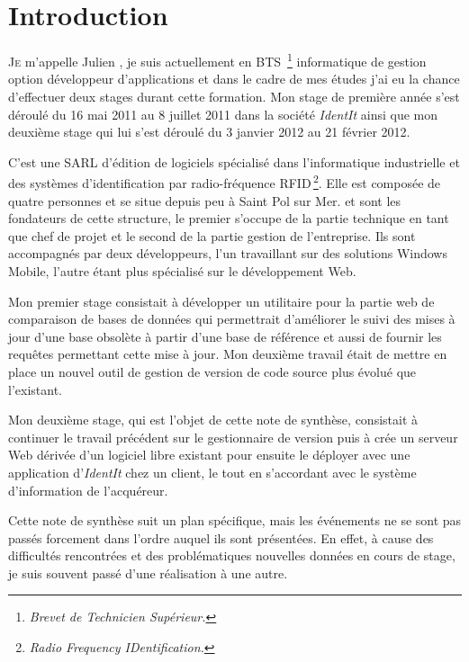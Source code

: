 \chapter{Introduction} %
\label{cha:Introduction}

\lettrine{J}{e} m'appelle Julien , je suis actuellement en
BTS\, \footnote{\emph{Brevet de Technicien Supérieur.}} informatique de
gestion option développeur d'applications et dans le cadre de mes études
j'ai eu la chance d'effectuer deux stages durant cette formation. Mon
stage de première année s'est déroulé du 16 mai 2011 au 8 juillet 2011
dans la société \emph{IdentIt} ainsi que mon deuxième stage qui lui
s'est déroulé du 3 janvier 2012 au 21 février 2012.

C'est une SARL d'édition de logiciels spécialisé dans l'informatique
industrielle et des systèmes d'identification par radio-fréquence
RFID\,\footnote{\emph{Radio Frequency IDentification.}}. Elle est
composée de quatre personnes et se situe depuis peu à Saint Pol sur Mer.
 et  sont les fondateurs de cette
structure, le premier s'occupe de la partie technique en tant que chef
de projet et le second de la partie gestion de l'entreprise. Ils sont
accompagnés par deux développeurs, l'un travaillant sur des solutions
Windows Mobile, l'autre étant plus spécialisé sur le
développement Web.

Mon premier stage consistait à développer un utilitaire pour la partie
web de comparaison de bases de données qui permettrait d'améliorer le
suivi des mises à jour d'une base obsolète à partir d'une base de
référence et aussi de fournir les requêtes permettant cette mise à jour.
Mon deuxième travail était de mettre en place un nouvel outil de gestion
de version de code source plus évolué que l'existant.

Mon deuxième stage, qui est l'objet de cette note de synthèse,
consistait à continuer le travail précédent sur le gestionnaire de
version puis à crée un serveur Web dérivée d'un logiciel libre existant
pour ensuite le déployer avec une application d'\emph{IdentIt} chez un
client, le tout en s'accordant avec le système d'information de
l'acquéreur.

Cette note de synthèse suit un plan spécifique, mais les événements ne
se sont pas passés forcement dans l'ordre auquel ils sont présentées. En
effet, à cause des difficultés rencontrées et des problématiques
nouvelles données en cours de stage, je suis souvent passé d'une
réalisation à une autre.
